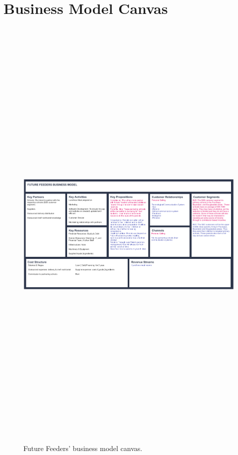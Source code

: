\section{Business Model Canvas}
\label{app:canvas}

\begin{figure}[H]
    \centering
    \includegraphics[angle=90, height=22cm]{canvas.png}
    \caption{Future Feeders' business model canvas.}
    \label{fig:canvas}
\end{figure}


